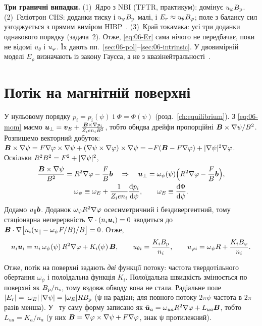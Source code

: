 \textbf{Три граничні випадки.} (1)~Ядро з NBI (TFTR, практикум): домінує $u_{\varphi}B_{\mathrm{p}}$. (2)~Геліотрон CHS: доданки тиску і $u_{\varphi}B_{\mathrm{p}}$ малі, і $E_{r}\approx u_\theta B_{\varphi}$; поле з балансу сил узгоджується з прямим виміром HIBP~\cite{Ida2001}. (3)~Край токамака: усі три доданки однакового порядку (задача~2). Отже, \eqref{eq:06-Er} сама нічого не передбачає, поки не відомі $u_\theta$ і $u_{\varphi}$. Їх дають пп.~\ref{sec:06-pol}--\ref{sec:06-intrinsic}. У двовимірній моделі $E_\rho$ визначають із закону Гаусса, а не з квазінейтральності~\cite{Seto2014}.

\section{Потік на магнітній поверхні}\label{sec:06-surface}

\begin{derivation}[форма потоку нульового порядку; EFIT, $\Bvec=\grad\psi\times\grad\varphi+F\grad\varphi$]
У нульовому порядку $p_i=p_i(\psi)$ і $\Phi=\Phi(\psi)$ (розд.~\ref{ch:equilibrium}). З \eqref{eq:06-mom} маємо $\bm{u}_\perp=\bm{v}_{E}+\frac{\bm{B}\times\nabla p_i}{Z_ien_iB^2}$, тобто обидва дрейфи пропорційні $\bm{B}\times\nabla\psi/B^2$. Розпишемо векторний добуток: $\bm{B}\times\nabla\psi=F\nabla\varphi\times\nabla\psi+(\nabla\psi\times\nabla\varphi)\times\nabla\psi=-F(\bm{B}-F\nabla\varphi)+|\nabla\psi|^2\nabla\varphi$. Оскільки $R^2B^2=F^2+|\nabla\psi|^2$,
\begin{gather*}
  \frac{\bm{B}\times\nabla\psi}{B^2}=R^2\nabla\varphi-\frac{F}{B}\bm{b}
  \quad\Rightarrow\quad
  \bm{u}_{\perp}=\omega_\psi(\psi)\Bigl(R^2\nabla\varphi-\frac{F}{B}\bm{b}\Bigr),\\
  \omega_\psi\equiv\omega_E+\frac{1}{Z_ien_i}\frac{\mathrm{d} p_i}{\mathrm{d}\psi},\qquad \omega_E\equiv\frac{\mathrm{d}\Phi}{\mathrm{d}\psi}.
\end{gather*}
Додамо $u_{\parallel}\bm{b}$. Доданок $\omega_\psi R^2\nabla\varphi$ осесиметричний і бездивергентний, тому стаціонарна неперервність $\nabla\cdot(n_i\bm{u}_i)=0$ зводиться до $\bm{B}\cdot\nabla\bigl[n_i(u_{\parallel}-\omega_\psi F/B)/B\bigr]=0$. Отже,
\begin{equation}\label{eq:06-uform}
  n_i\bm{u}_i=n_i\,\omega_\psi(\psi)\,R^2\nabla\varphi+K_i(\psi)\,\bm{B},\qquad
  u_{\theta i}=\frac{K_iB_{\mathrm{p}}}{n_i},\qquad u_{\varphi i}=\omega_\psi R+\frac{K_iB_{\varphi}}{n_i}.
\end{equation}
\end{derivation}

Отже, потік на поверхні задають \emph{дві} функції потоку: частота твердотільного обертання $\omega_\psi$ і полоїдальна функція $K_i$. Полоїдальна швидкість змінюється по поверхні як $B_{\mathrm{p}}/n_i$, тому вздовж обводу вона не стала. Радіальне поле $|E_{r}|=|\omega_E|\,|\nabla\psi|=|\omega_E|RB_{\mathrm{p}}$ (ψ на радіан; для повного потоку $2\pi\psi$ частота в $2\pi$ разів менша). У~\cite[рівн.~53]{Seto2014} ту саму форму записано як $\bar{\bm{u}}_a=\omega_{ua}R^2\nabla\varphi+L_{ua}\bm{B}$, тобто $L_{ua}=K_a/n_a$ (у них $\bm{B}=\nabla\varphi\times\nabla\psi+F\nabla\varphi$, знак ψ протилежний).

